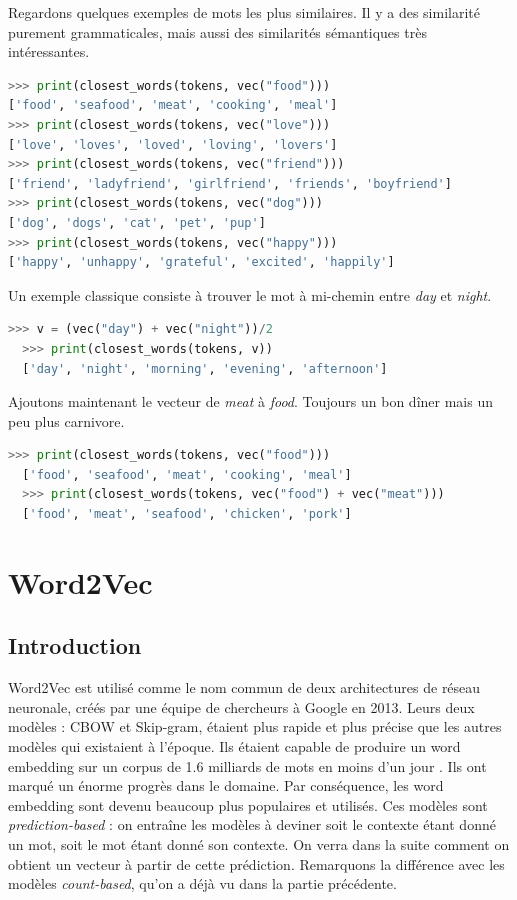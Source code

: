 \documentclass[11pt, a4paper]{report}
\begin{document}
Regardons quelques exemples de mots les plus similaires. Il y a des similarité 
purement grammaticales, mais aussi des similarités sémantiques très intéressantes.
\begin{lstlisting}[language=Python]
  >>> print(closest_words(tokens, vec("food")))
['food', 'seafood', 'meat', 'cooking', 'meal']
>>> print(closest_words(tokens, vec("love")))
['love', 'loves', 'loved', 'loving', 'lovers']
>>> print(closest_words(tokens, vec("friend")))
['friend', 'ladyfriend', 'girlfriend', 'friends', 'boyfriend']
>>> print(closest_words(tokens, vec("dog")))
['dog', 'dogs', 'cat', 'pet', 'pup']
>>> print(closest_words(tokens, vec("happy")))
['happy', 'unhappy', 'grateful', 'excited', 'happily']
\end{lstlisting}  

Un exemple classique consiste à trouver le mot à mi-chemin entre \textit{day} et 
\textit{night}.
\begin{lstlisting}[language=Python]
  >>> v = (vec("day") + vec("night"))/2
  >>> print(closest_words(tokens, v))
  ['day', 'night', 'morning', 'evening', 'afternoon']
\end{lstlisting}  

Ajoutons maintenant le vecteur de \textit{meat} à \textit{food}.
Toujours un bon dîner mais un peu plus carnivore. 
\begin{lstlisting}[language=Python]
  >>> print(closest_words(tokens, vec("food")))
  ['food', 'seafood', 'meat', 'cooking', 'meal']
  >>> print(closest_words(tokens, vec("food") + vec("meat")))
  ['food', 'meat', 'seafood', 'chicken', 'pork']
\end{lstlisting}  

\section{Word2Vec}
\subsection{Introduction}
\cite{wikipedia-word2vec} \cite{wikipedia-word2vec-fr} Word2Vec est utilisé comme le nom commun de deux architectures de réseau neuronale, créés par 
une équipe de chercheurs à Google en 2013. Leurs deux modèles : CBOW et Skip-gram, étaient plus 
rapide et plus précise que les autres modèles qui existaient à l'époque. Ils étaient capable 
de produire un word embedding sur un corpus de 1.6 milliards de mots en moins d'un jour \cite{word2vec-original}.
Ils ont marqué un énorme progrès dans le domaine. Par conséquence, les word embedding sont 
devenu beaucoup plus populaires et utilisés. Ces modèles sont \textit{prediction-based} : on 
entraîne les modèles à deviner soit le contexte étant donné un mot, soit le mot étant donné
son contexte. On verra dans la suite comment on obtient un vecteur à partir de cette prédiction.
Remarquons la différence avec les modèles \textit{count-based}, qu'on a déjà vu dans la partie 
précédente.
\end{document}
